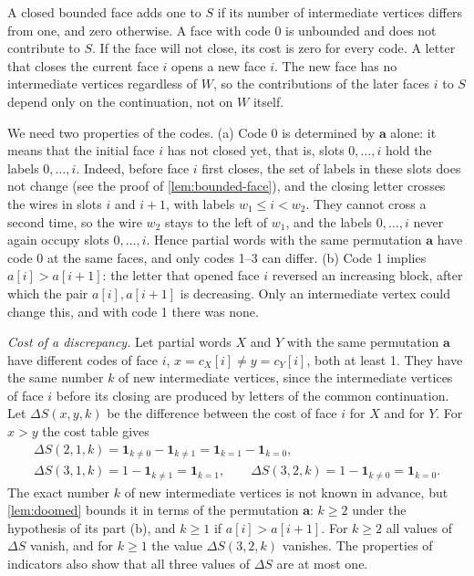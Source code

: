 A closed bounded face adds one to $S$ if its number of intermediate vertices differs from one, and zero otherwise. A face with code 0 is unbounded and does not contribute to $S$.
If the face will not close, its cost is zero for every code.
A letter that closes the current face $i$ opens a new face $i$.
The new face has no intermediate vertices regardless of $W$, so the contributions of the later faces $i$ to $S$ depend only on the continuation, not on $W$ itself.

We need two properties of the codes.
(a) Code 0 is determined by $\mathbf a$ alone: it means that the initial face $i$ has not closed yet, that is, slots $0,\ldots,i$ hold the labels $0,\ldots,i$.
Indeed, before face $i$ first closes, the set of labels in these slots does not change (see the proof of \cref{lem:bounded-face}), and the closing letter crosses the wires in slots $i$ and $i+1$, with labels $w_1\le i<w_2$. They cannot cross a second time, so the wire $w_2$ stays to the left of $w_1$, and the labels $0,\ldots,i$ never again occupy slots $0,\ldots,i$.
Hence partial words with the same permutation $\mathbf a$ have code 0 at the same faces, and only codes 1--3 can differ.
(b) Code 1 implies $a[i]>a[i+1]$: the letter that opened face $i$ reversed an increasing block, after which the pair $a[i],a[i+1]$ is decreasing. Only an intermediate vertex could change this, and with code 1 there was none.

\emph{Cost of a discrepancy.} Let partial words $X$ and $Y$ with the same permutation $\mathbf a$ have different codes of face $i$, $x=c_X[i]\ne y=c_Y[i]$, both at least 1.
They have the same number $k$ of new intermediate vertices, since the intermediate vertices of face $i$ before its closing are produced by letters of the common continuation.
Let $\Delta S(x,y,k)$ be the difference between the cost of face $i$ for $X$ and for $Y$.
For $x>y$ the cost table gives
\[
\begin{gathered}
\Delta S(2,1,k)=\mathbf 1_{k\ne 0}-\mathbf 1_{k\ne 1}=\mathbf 1_{k=1}-\mathbf 1_{k=0},\\
\Delta S(3,1,k)=1-\mathbf 1_{k\ne 1}=\mathbf 1_{k=1},\qquad
\Delta S(3,2,k)=1-\mathbf 1_{k\ne 0}=\mathbf 1_{k=0}.
\end{gathered}
\]
The exact number $k$ of new intermediate vertices is not known in advance, but \cref{lem:doomed} bounds it in terms of the permutation $\mathbf a$: $k\ge2$ under the hypothesis of its part (b), and $k\ge1$ if $a[i]>a[i+1]$.
For $k\ge2$ all values of $\Delta S$ vanish, and for $k\ge1$ the value $\Delta S(3,2,k)$ vanishes.
The properties of indicators also show that all three values of $\Delta S$ are at most one.

